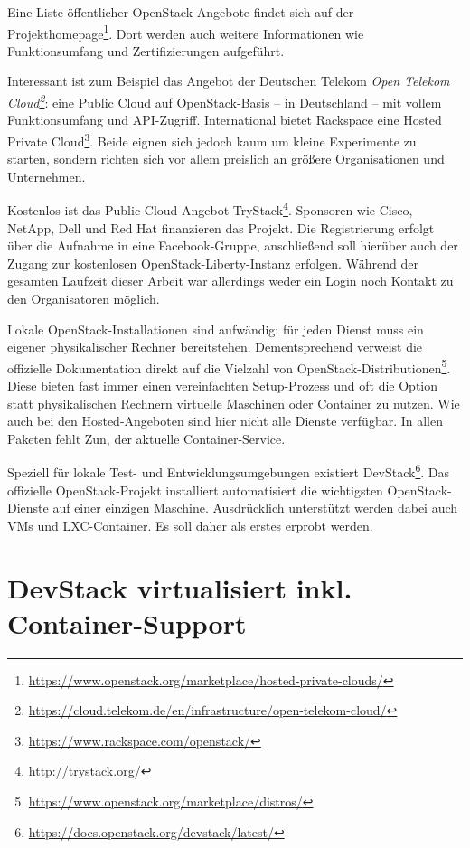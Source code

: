 \noindent Eine Liste öffentlicher OpenStack-Angebote findet sich auf der Projekthomepage\footnote{\url{https://www.openstack.org/marketplace/hosted-private-clouds/}}. Dort werden auch weitere Informationen wie Funktionsumfang und Zertifizierungen aufgeführt. 

Interessant ist zum Beispiel das Angebot der Deutschen Telekom \emph{Open Telekom Cloud\footnote{\url{https://cloud.telekom.de/en/infrastructure/open-telekom-cloud/}}}: eine Public Cloud auf OpenStack-Basis -- in Deutschland -- mit vollem Funktionsumfang und API-Zugriff. International bietet Rackspace eine Hosted Private Cloud\footnote{\url{https://www.rackspace.com/openstack/}}. Beide eignen sich jedoch kaum um kleine Experimente zu starten, sondern richten sich vor allem preislich an größere Organisationen und Unternehmen.

Kostenlos ist das Public Cloud-Angebot TryStack\footnote{\url{http://trystack.org/}}. Sponsoren wie Cisco, \mbox{NetApp}, Dell und Red Hat finanzieren das Projekt. Die Registrierung erfolgt über die Aufnahme in eine Facebook-Gruppe, anschließend soll hierüber auch der Zugang zur kostenlosen OpenStack-Liberty-Instanz erfolgen. Während der gesamten Laufzeit dieser Arbeit war allerdings weder ein Login noch Kontakt zu den Organisatoren möglich.

Lokale OpenStack-Installationen sind aufwändig: für jeden Dienst muss ein eigener physikalischer Rechner bereitstehen. Dementsprechend verweist die offizielle Dokumentation direkt auf die Vielzahl von OpenStack-Distributionen\footnote{\url{https://www.openstack.org/marketplace/distros/}}. Diese bieten fast immer einen vereinfachten Setup-Prozess und oft die Option statt physikalischen Rechnern virtuelle Maschinen oder Container zu nutzen. Wie auch bei den Hosted-Angeboten sind hier nicht alle Dienste verfügbar. In allen Paketen fehlt Zun, der aktuelle Container-Service.

Speziell für lokale Test- und Entwicklungsumgebungen existiert DevStack\footnote{\url{https://docs.openstack.org/devstack/latest/}}. Das offizielle OpenStack-Projekt installiert automatisiert die wichtigsten OpenStack-Dienste auf einer einzigen Maschine. Ausdrücklich unterstützt werden dabei auch VMs und LXC-Container. Es soll daher als erstes erprobt werden.


\section{DevStack virtualisiert inkl. Container-Support}

